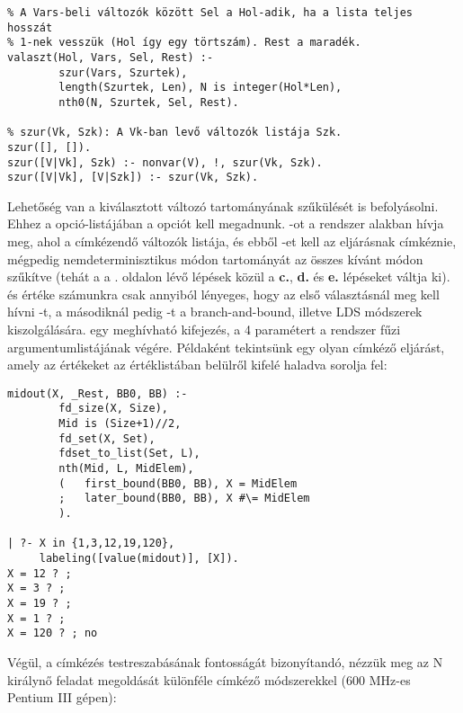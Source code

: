 \begin{verbatim}
% A Vars-beli változók között Sel a Hol-adik, ha a lista teljes hosszát
% 1-nek vesszük (Hol így egy törtszám). Rest a maradék.
valaszt(Hol, Vars, Sel, Rest) :-
        szur(Vars, Szurtek), 
        length(Szurtek, Len), N is integer(Hol*Len),
        nth0(N, Szurtek, Sel, Rest).

% szur(Vk, Szk): A Vk-ban levő változók listája Szk.
szur([], []).
szur([V|Vk], Szk) :- nonvar(V), !, szur(Vk, Szk).
szur([V|Vk], [V|Szk]) :- szur(Vk, Szk).
\end{verbatim}

\label{value:enum}
Lehetőség van a kiválasztott változó tartományának szűkülését is befolyásolni. Ehhez a
 opció-listájában a  opciót kell megadnunk. -ot
a rendszer  alakban hívja meg, ahol \cd{[X|Rest]} a címkézendő
változók listája, és ebből -et kell az eljárásnak címkéznie, mégpedig
nemdeterminisztikus módon  tartományát az összes kívánt módon szűkítve (tehát
a  a \pageref{labeling:lepesek}. oldalon lévő lépések közül a
{\bf c.}, {\bf d.} és {\bf e.} lépéseket váltja ki).  és  értéke számunkra
csak annyiból lényeges, hogy az első választásnál meg kell hívni -t,
a másodiknál pedig -t a branch-and-bound, illetve LDS módszerek
kiszolgálására.  egy meghívható kifejezés, a 4 paramétert a rendszer fűzi 
argumentumlistájának végére. Példaként tekintsünk egy olyan címkéző eljárást, amely
az értékeket az értéklistában belülről kifelé haladva sorolja fel:

\begin{verbatim}
midout(X, _Rest, BB0, BB) :-
        fd_size(X, Size),
        Mid is (Size+1)//2,
        fd_set(X, Set), 
        fdset_to_list(Set, L),
        nth(Mid, L, MidElem),
        (   first_bound(BB0, BB), X = MidElem
        ;   later_bound(BB0, BB), X #\= MidElem
        ).

| ?- X in {1,3,12,19,120}, 
     labeling([value(midout)], [X]).
X = 12 ? ;
X = 3 ? ;
X = 19 ? ;
X = 1 ? ;
X = 120 ? ; no
\end{verbatim}

Végül, a címkézés testreszabásának fontosságát bizonyítandó, nézzük meg az N királynő
feladat megoldását különféle címkéző módszerekkel (600 MHz-es Pentium III gépen):

